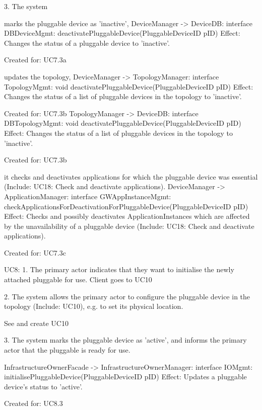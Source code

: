         3. The system
           { marks the pluggable device as 'inactive',
            DeviceManager -> DeviceDB: interface DBDeviceMgmt: deactivatePluggableDevice(PluggableDeviceID pID)
                Effect: Changes the status of a pluggable device to 'inactive'.
                \item Created for: UC7.3a

           { updates the topology,
            DeviceManager -> TopologyManager: interface TopologyMgmt: void deactivatePluggableDevice(PluggableDeviceID pID)
                Effect: Changes the status of a list of pluggable devices in the topology to 'inactive'.
                \item Created for: UC7.3b
            TopologyManager -> DeviceDB: interface DBTopologyMgmt: void deactivatePluggableDevice(PluggableDeviceID pID)
                Effect: Changes the status of a list of pluggable devices in the topology to 'inactive'.
                \item Created for: UC7.3b

           { it checks and deactivates applications for which the pluggable device was essential (Include: UC18: Check and deactivate applications).
            DeviceManager -> ApplicationManager: interface GWAppInstanceMgmt: checkApplicationsForDeactivationForPluggableDevice(PluggableDeviceID pID)
               Effect: Checks and possibly deactivates ApplicationInstances which are affected by the unavailability of a pluggable device (Include: UC18: Check and deactivate applications).
               \item Created for: UC7.3c


    UC8:
        1. The primary actor indicates that they want to initialise the newly attached pluggable for use.
            Client goes to UC10

        2. The system allows the primary actor to configure the pluggable device in the topology (Include: UC10), e.g. to set its physical location.

            See and create UC10

        3. The system marks the pluggable device as 'active', and informs the primary actor that the pluggable is ready for use.

            InfrastructureOwnerFacade -> InfrastructureOwnerManager: interface IOMgmt: initialisePluggableDevice(PluggableDeviceID pID)
                Effect: Updates a pluggable device's status to 'active'.
                \item Created for: UC8.3

}}}
